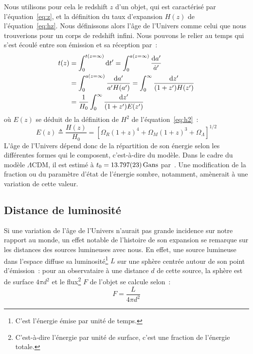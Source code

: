 \documentclass[../main/main.tex]{subfiles}
\begin{document}
Nous utilisons pour cela le redshift $z$ d'un objet, qui est caractérisé par
l'équation~\ref{eq:z}, et la définition du taux d'expansion $H(z)$ de
l'équation~\ref{eq:hz}. Nous définissons alors l'âge de l'Univers comme celui
que nous trouverions pour un corps de redshift infini. Nous pouvons le relier au
temps qui s'est écoulé entre son émission et sa réception par~:
\begin{align}
    t(z) & = \int_{0}^{t(z=\infty)} \mathrm{d} t' = \int_{0}^{a(z=\infty)} \frac{\mathrm{d} a'}{\dot{a}'}
    \nonumber\\
         & = \int_{0}^{a(z=\infty)} \frac{\mathrm{d} a'}{a'H(a')} = \int_{0}^{\infty} \frac{\mathrm{d}
         z'}{(1+z')H(z')}\nonumber\\
         & = \frac{1}{H_0} \int_{0}^{\infty} \frac{\mathrm{d} z'}{(1+z')E(z')}
\end{align}
où $E(z)$ se déduit de la définition de $H^2$ de l'équation~\ref{eq:h2}~:
\begin{equation}\label{eq:ez}
    E(z) \triangleq \frac{H(z)}{H_0} = \left[ \Omega_R(1+z)^4 + \Omega_M(1+z)^3
    + \Omega_\Lambda\right]^{1/2}
\end{equation}
L'âge de l'Univers dépend donc de la répartition de son énergie selon les
différentes formes qui le composent, c'est-à-dire du modèle. Dans le cadre du
modèle $\Lambda$CDM, il est estimé à $t_0 = \SI{13.797\pm0.023}{Gans}$
par~\cite{planck2018}. Une modification de la fraction ou du paramètre d'état de
l'énergie sombre, notamment, amènerait à une variation de cette valeur.

\subsection{Distance de luminosité}\label{ssec:dl}

Si une variation de l'âge de l'Univers n'aurait pas grande incidence sur notre
rapport au monde, un effet notable de l'histoire de son expansion se remarque
sur les distances des sources lumineuses avec nous. En effet, une source
lumineuse dans l'espace diffuse sa luminosité\footnote{C'est l'énergie émise par
unité de temps.} $L$ sur une sphère centrée autour de son point d'émission~:
pour an observataire à une distance $d$ de cette source, la sphère est de
surface $4\pi d^2$ et le flux\footnote{C'est-à-dire l'énergie par unité de
surface, c'est une fraction de l'énergie totale.} $F$ de l'objet se calcule
selon~:
\begin{equation}\label{eq:f}
    F = \frac{L}{4\pi d^2}
\end{equation}
\end{document}
